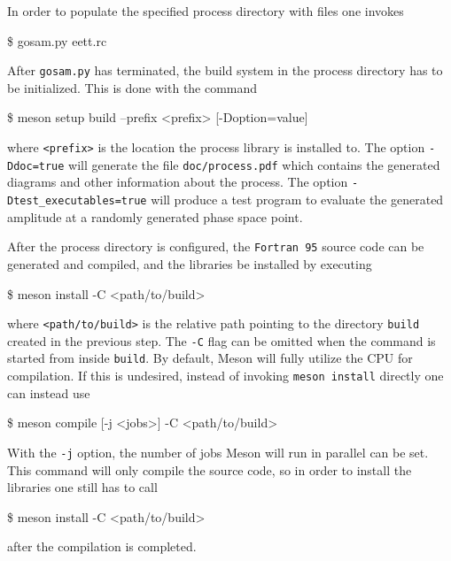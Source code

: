 \documentclass[11pt,a4paper]{refrep}
\newcommand{\fortranXC}{{\tt Fortran\,95}\xspace}
\begin{document}
In order to populate the specified process directory with files
one invokes
\begin{example}
\$ gosam.py eett.rc
\end{example}
After \texttt{gosam{.}py} has terminated, the build system in the process directory has to be initialized. This is done with the command
\begin{example}
\$ meson setup build --prefix <prefix> [-Doption=value]
\end{example}
where \texttt{<prefix>} is the location the process library is installed to. The option \texttt{-Ddoc=true} will generate the file \texttt{doc/process.pdf} which contains the generated diagrams and other information about the process. The option \texttt{-Dtest\_executables=true} will produce a test program to evaluate the generated amplitude at a randomly generated phase space point.

After the process directory is configured, the \fortranXC source code can be generated and compiled, and the libraries be installed by executing
\begin{example}
\$ meson install -C <path/to/build>
\end{example}
where \texttt{<path/to/build>} is the relative path pointing to the directory \texttt{build} created in the previous step. The \texttt{-C} flag can be omitted when the command is started from inside \texttt{build}. By default, Meson will fully utilize the CPU for compilation. If this is undesired, instead of invoking \texttt{meson install} directly one can instead use
\begin{example}
\$ meson compile [-j <jobs>] -C <path/to/build>
\end{example}
 With the \texttt{-j} option, the number of jobs Meson will run in parallel can be set. This command will only compile the source code, so in order to install the libraries one still has to call
 \begin{example}
\$ meson install -C <path/to/build>
\end{example}
after the compilation is completed.
\end{document}
